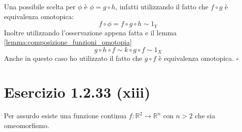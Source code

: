 \documentclass[10pt]{scrartcl}
\begin{document}
Una possibile scelta per $ \phi $ è $ \phi = g \circ h $, infatti utilizzando
il fatto che $ f \circ g $ è equivalenza omotopica:
\[
  f \circ \phi = f \circ g \circ h \sim 1_Y
\]
Inoltre utilizzando l'osservazione appena fatta e il lemma
\ref{lemma:composizione_funzioni_omotopia}
\[
  g \circ h \circ f \sim k \circ g \circ f \sim 1_X
\]
Anche in questo caso ho utilizzato il fatto che $ g \circ f $ è equivalenza
omotopica.
\hfill $ \square $


\section*{Esercizio 1.2.33 (xiii)}
Per assurdo esiste una funzione continua $ f \colon \mathbb{R}^2 \to \mathbb{R}^n $
con $ n > 2 $ che sia omeomorfismo.
\end{document}
